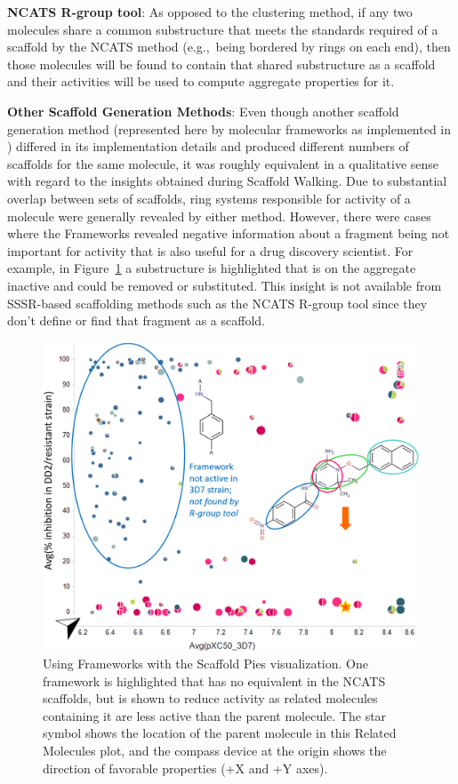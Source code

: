 \documentclass[11pt,letterpaper]{article}
\newcommand*\fref[1]{Figure~\ref{fig:#1}}
\newcommand*\eg{e.g.,~}
\begin{document}
{\bf NCATS R-group tool}: As opposed to the clustering method, 
if any two molecules share a common substructure that meets the standards required of a scaffold by the NCATS method (\eg being bordered by rings on each end), then those molecules will be found to contain that shared substructure as a scaffold and their activities will be used to compute aggregate properties for it. 

{\bf Other Scaffold Generation Methods}: Even though another scaffold generation method (represented here by molecular frameworks as implemented in \cite{Harper2004DDclus}) differed in its implementation details and produced different numbers of scaffolds for the same molecule, it was roughly equivalent in a qualitative sense with regard to the insights obtained during Scaffold Walking. Due to substantial overlap between sets of scaffolds, ring systems responsible for activity of a molecule were generally revealed by either method. However, there were cases where the Frameworks revealed negative information about a fragment being not important for activity that is also useful for a drug discovery scientist. For example, in \fref{frameswalk} a substructure is highlighted that is on the aggregate inactive and could be removed or substituted. This insight is not available from SSSR-based scaffolding methods such as the NCATS R-group tool since they don't define or find that fragment as a scaffold.

\begin{figure}
\includegraphics[width=5in]{../fig/mol1_frames_scafpie_v2.png}
\caption{Using Frameworks with the Scaffold Pies visualization. One framework is highlighted that has no equivalent in the NCATS scaffolds, but is shown to reduce activity as related molecules containing it are less active than the parent molecule.   The star symbol shows the location of the parent molecule in this Related Molecules plot, and the compass device at the origin shows the direction of favorable properties (+X and +Y axes).}      
\label{fig:frameswalk}
\end{figure}
\end{document}

